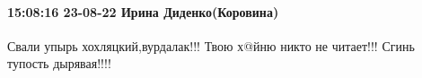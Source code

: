  
 
 
 
 

\paragraph{15:08:16 23-08-22 Ирина Диденко(Коровина)}

Свали упырь хохляцкий,вурдалак!!! Твою х@йню никто не читает!!! Сгинь тупость
дырявая!!!!
